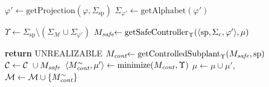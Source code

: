 \begin{minipage}[t]{0.5\textwidth} %
\begin{algorithm}[H]
\scriptsize
\caption{\scriptsize{$\text{\textbf{PartialSynthesis}}(\mathcal{M}, \mathcal{C}, \text{sp}, \Sigma_c, \varphi)$}}
\begin{algorithmic}[1]

\STATE $\varphi' \gets \text{getProjection}(\varphi, \Sigma_{\text{sp}})$
\STATE $\Sigma_{\varphi'} \gets \text{getAlphabet}(\varphi')$

\STATE $\Upsilon \gets \Sigma_{\text{sp}} \setminus (\Sigma_{\mathcal{M}} \cup \Sigma_{\varphi'})$
\STATE $M_{\mbox{\textit{\scriptsize 
        safe}}} \!\! \gets \text{getSafeController}_{\Upsilon}(\langle \text{sp}, \Sigma_c, \varphi' \rangle, \mu)$
        
\STATE \textbf{return} UNREALIZABLE
\ENDIF
\STATE $M_{\mbox{\textit{\scriptsize 
        cont}}} \!\! \gets \text{getControlledSubplant}_{\Upsilon}(M_{\mbox{\textit{\scriptsize 
        safe}}}, \text{sp})$
\STATE $\mathcal{C} \gets \mathcal{C} \ \cup M_{\mbox{\textit{\scriptsize 
        safe}}}$
\STATE $\langle \text{$M_{\mbox{\textit{\scriptsize 
        cont}}}^{\sim}$}, \mu' \rangle \gets \text{minimize}(\text{$M_{\mbox{\textit{\scriptsize 
        cont}}}$}, \Upsilon)$
\STATE $\mu \gets \mu \cup \mu'$, $\mathcal{M} \gets \mathcal{M} \cup \{\text{$M_{\mbox{\textit{\scriptsize 
        cont}}}^{\sim}$}\}$
\end{algorithmic}
\end{algorithm}
\end{minipage}
